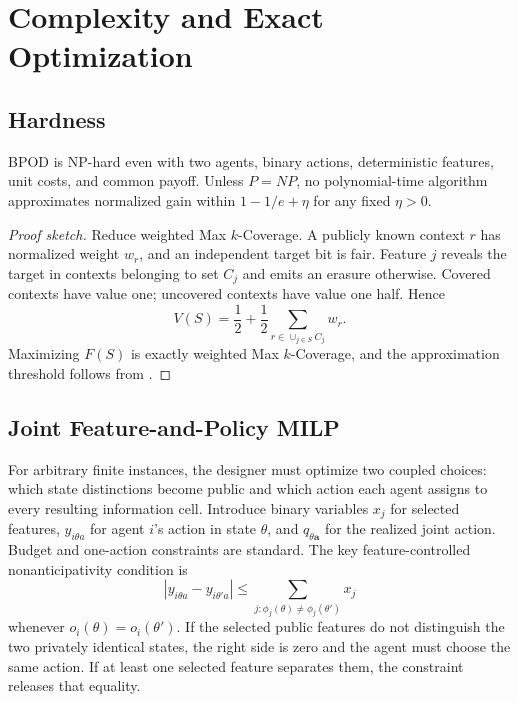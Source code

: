\section{Complexity and Exact Optimization}

\subsection{Hardness}

\begin{theorem}\label{thm:hard}
BPOD is NP-hard even with two agents, binary actions, deterministic features, unit costs, and common payoff. Unless $P=NP$, no polynomial-time algorithm approximates normalized gain within $1-1/e+\eta$ for any fixed $\eta>0$.
\end{theorem}

\begin{proof}[Proof sketch]
Reduce weighted Max $k$-Coverage. A publicly known context $r$ has normalized weight $w_r$, and an independent target bit is fair. Feature $j$ reveals the target in contexts belonging to set $C_j$ and emits an erasure otherwise. Covered contexts have value one; uncovered contexts have value one half. Hence
\[
V(S)=\frac12+\frac12\sum_{r\in\cup_{j\in S}C_j}w_r.
\]
Maximizing $F(S)$ is exactly weighted Max $k$-Coverage, and the approximation threshold follows from \citet{Feige1998}.
\end{proof}

\subsection{Joint Feature-and-Policy MILP}

For arbitrary finite instances, the designer must optimize two coupled choices: which state distinctions become public and which action each agent assigns to every resulting information cell. Introduce binary variables $x_j$ for selected features, $y_{i\theta a}$ for agent $i$'s action in state $\theta$, and $q_{\theta\mathbf a}$ for the realized joint action. Budget and one-action constraints are standard. The key feature-controlled nonanticipativity condition is
\begin{equation}\label{eq:nonanticipativity}
|y_{i\theta a}-y_{i\theta'a}|
\le
\sum_{j:\phi_j(\theta)\ne\phi_j(\theta')}x_j
\end{equation}
whenever $o_i(\theta)=o_i(\theta')$. If the selected public features do not distinguish the two privately identical states, the right side is zero and the agent must choose the same action. If at least one selected feature separates them, the constraint releases that equality.

